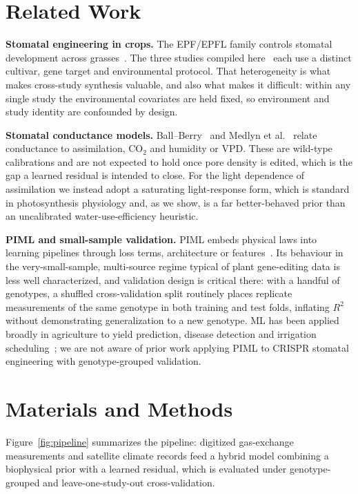 \documentclass[runningheads]{llncs}
\begin{document}
\section{Related Work}\label{sec:related}

\textbf{Stomatal engineering in crops.} The EPF/EPFL family controls stomatal development across grasses~\cite{ref_hepworth}. The three studies compiled here~\cite{ref_caine,ref_kara2023,ref_kara2024} each use a distinct cultivar, gene target and environmental protocol. That heterogeneity is what makes cross-study synthesis valuable, and also what makes it difficult: within any single study the environmental covariates are held fixed, so environment and study identity are confounded by design.

\textbf{Stomatal conductance models.} Ball--Berry~\cite{ref_ball_berry} and Medlyn et al.~\cite{ref_medlyn} relate conductance to assimilation, CO$_2$ and humidity or VPD. These are wild-type calibrations and are not expected to hold once pore density is edited, which is the gap a learned residual is intended to close. For the light dependence of assimilation we instead adopt a saturating light-response form, which is standard in photosynthesis physiology and, as we show, is a far better-behaved prior than an uncalibrated water-use-efficiency heuristic.

\textbf{PIML and small-sample validation.} PIML embeds physical laws into learning pipelines through loss terms, architecture or features~\cite{ref_karniadakis,ref_willard}. Its behaviour in the very-small-sample, multi-source regime typical of plant gene-editing data is less well characterized, and validation design is critical there: with a handful of genotypes, a shuffled cross-validation split routinely places replicate measurements of the same genotype in both training and test folds, inflating $R^{2}$ without demonstrating generalization to a new genotype. ML has been applied broadly in agriculture to yield prediction, disease detection and irrigation scheduling~\cite{ref_ml_agri}; we are not aware of prior work applying PIML to CRISPR stomatal engineering with genotype-grouped validation.

\section{Materials and Methods}\label{sec:methods}

Figure~\ref{fig:pipeline} summarizes the pipeline: digitized gas-exchange measurements and satellite climate records feed a hybrid model combining a biophysical prior with a learned residual, which is evaluated under genotype-grouped and leave-one-study-out cross-validation.
\end{document}
